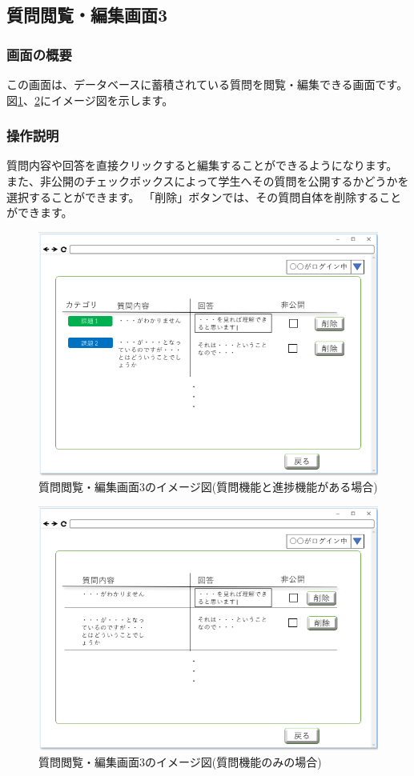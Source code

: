 \newpage

\subsection{質問閲覧・編集画面3}
\subsubsection{画面の概要}
この画面は、データベースに蓄積されている質問を閲覧・編集できる画面です。
図\ref{fig:19}、\ref{fig:000}にイメージ図を示します。

\subsubsection{操作説明}
質問内容や回答を直接クリックすると編集することができるようになります。
また、非公開のチェックボックスによって学生へその質問を公開するかどうかを選択することができます。
「削除」ボタンでは、その質問自体を削除することができます。

\begin{figure}[htbp]
  \begin{center}
    \includegraphics[width=0.8\linewidth,clip]{./img/19.png}
    \caption{質問閲覧・編集画面3のイメージ図(質問機能と進捗機能がある場合)}\label{fig:19}
  \end{center}
\end{figure}
\begin{figure}[htbp]
  \begin{center}
    \includegraphics[width=0.8\linewidth,clip]{./img/000.png}
    \caption{質問閲覧・編集画面3のイメージ図(質問機能のみの場合)}\label{fig:000}
  \end{center}
\end{figure}

